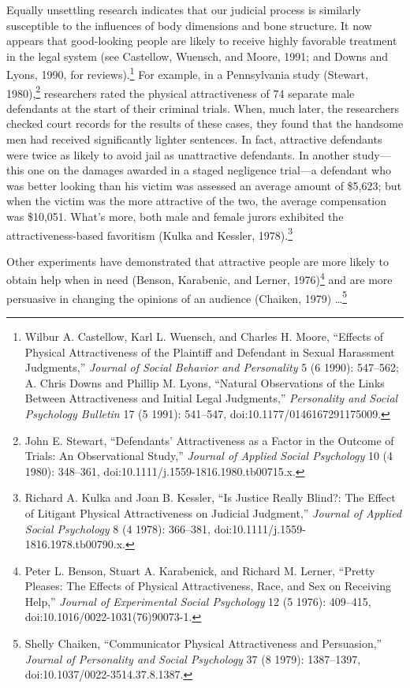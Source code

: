 {
 Equally unsettling research indicates that our judicial process is
similarly susceptible to the influences of body dimensions and bone
structure. It now appears that good-looking people are likely to
receive highly favorable treatment in the legal system (see Castellow,
Wuensch, and Moore, 1991; and Downs and Lyons, 1990, for
reviews).\footnote{Wilbur A. Castellow, Karl L. Wuensch, and Charles H. Moore,
``Effects of Physical Attractiveness of the Plaintiff
and Defendant in Sexual Harassment Judgments,''
\textit{Journal of Social Behavior and Personality} 5 (6 1990):
547--562; A. Chris Downs and Phillip M. Lyons,
``Natural Observations of the Links Between
Attractiveness and Initial Legal Judgments,''
\textit{Personality and Social Psychology Bulletin} 17 (5 1991):
541--547, doi:10.1177/0146167291175009.} For example, in a Pennsylvania study
(Stewart, 1980),\footnote{John E. Stewart, ``Defendants'
Attractiveness as a Factor in the Outcome of Trials: An Observational
Study,'' \textit{Journal of Applied Social
Psychology} 10 (4 1980): 348--361,
doi:10.1111/j.1559-1816.1980.tb00715.x.} researchers rated the physical
attractiveness of 74 separate male defendants at the start of their
criminal trials. When, much later, the researchers checked court
records for the results of these cases, they found that the handsome
men had received significantly lighter sentences. In fact, attractive
defendants were twice as likely to avoid jail as unattractive
defendants. In another study---this one on the damages awarded in a
staged negligence trial---a defendant who was better looking than his
victim was assessed an average amount of \$5,623; but when the victim
was the more attractive of the two, the average compensation was
\$10,051. What's more, both male and female jurors
exhibited the attractiveness-based favoritism (Kulka and Kessler,
1978).\footnote{Richard A. Kulka and Joan B. Kessler, ``Is
Justice Really Blind?: The Effect of Litigant Physical Attractiveness
on Judicial Judgment,'' \textit{Journal of Applied
Social Psychology} 8 (4 1978): 366--381,
doi:10.1111/j.1559-1816.1978.tb00790.x.}}

{
 Other experiments have demonstrated that attractive people are
more likely to obtain help when in need (Benson, Karabenic, and Lerner,
1976)\footnote{Peter L. Benson, Stuart A. Karabenick, and Richard M. Lerner,
``Pretty Pleases: The Effects of Physical
Attractiveness, Race, and Sex on Receiving Help,''
\textit{Journal of Experimental Social Psychology} 12 (5 1976):
409--415, doi:10.1016/0022-1031(76)90073-1.} and are more persuasive in changing the
opinions of an audience (Chaiken, 1979) \ldots\footnote{Shelly Chaiken, ``Communicator Physical
Attractiveness and Persuasion,'' \textit{Journal of
Personality and Social Psychology} 37 (8 1979): 1387--1397,
doi:10.1037/0022-3514.37.8.1387.}}

